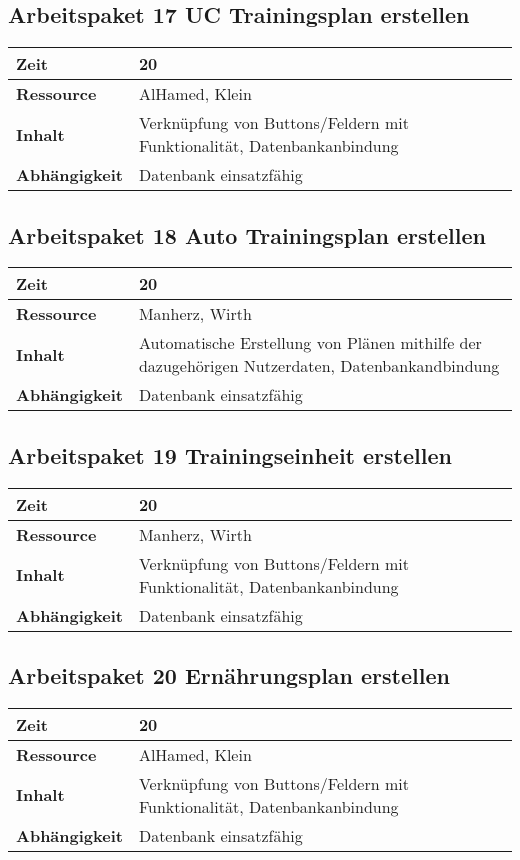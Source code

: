 \documentclass[12pt,a4paper,onecolumn]{article}
\begin{document}
\subsection{Arbeitspaket 17 UC Trainingsplan erstellen}
\begin{tabularx}{\textwidth}{|l|X|}
\hline
     \textbf{Zeit} & 20 \\
     \hline
     \textbf{Ressource} & AlHamed, Klein \\
     \hline
     \textbf{Inhalt} &  Verknüpfung von Buttons/Feldern mit Funktionalität, Datenbankanbindung\\
     \hline
     \textbf{Abhängigkeit} & Datenbank einsatzfähig\\
\hline
\end{tabularx}
\subsection{Arbeitspaket 18 Auto Trainingsplan erstellen}
\begin{tabularx}{\textwidth}{|l|X|}
\hline
     \textbf{Zeit} & 20 \\
     \hline
     \textbf{Ressource} & Manherz, Wirth\\
     \hline
     \textbf{Inhalt} &  Automatische Erstellung von Plänen mithilfe der dazugehörigen Nutzerdaten, Datenbankandbindung\\
     \hline
     \textbf{Abhängigkeit} & Datenbank einsatzfähig\\
\hline
\end{tabularx}
\subsection{Arbeitspaket 19 Trainingseinheit erstellen}
\begin{tabularx}{\textwidth}{|l|X|}
\hline
     \textbf{Zeit} & 20 \\
     \hline
     \textbf{Ressource} & Manherz, Wirth \\
     \hline
     \textbf{Inhalt} &  Verknüpfung von Buttons/Feldern mit Funktionalität, Datenbankanbindung\\
     \hline
     \textbf{Abhängigkeit} & Datenbank einsatzfähig\\
\hline
\end{tabularx}
\subsection{Arbeitspaket 20 Ernährungsplan erstellen}
\begin{tabularx}{\textwidth}{|l|X|}
\hline
     \textbf{Zeit} & 20 \\
     \hline
     \textbf{Ressource} & AlHamed, Klein\\
     \hline
     \textbf{Inhalt} &  Verknüpfung von Buttons/Feldern mit Funktionalität, Datenbankanbindung\\
     \hline
     \textbf{Abhängigkeit} & Datenbank einsatzfähig\\
\hline
\end{tabularx}
\end{document}
